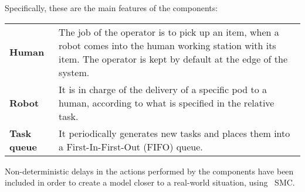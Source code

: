 \noindent Specifically, these are the main features of the components:
\vspace{0,2cm}
\begin{tabularx}{\textwidth}{lX}
\textbf{Human} & The job of the operator is to pick up an item, when a robot comes into the human working station with its item. The operator is kept by default at the edge of the system.\vspace{0,2cm}\\
\textbf{Robot} & It is in charge of the delivery of a specific pod to a human, according to what is specified in the relative task.\vspace{0,2cm}\\
\textbf{Task queue} & It periodically generates new tasks and places them into a First-In-First-Out (FIFO) queue.\vspace{0,2cm}\\
\end{tabularx}

Non-deterministic delays in the actions performed by the components have been included in order to create a model closer to a real-world situation, using \UPPAAL \ SMC.